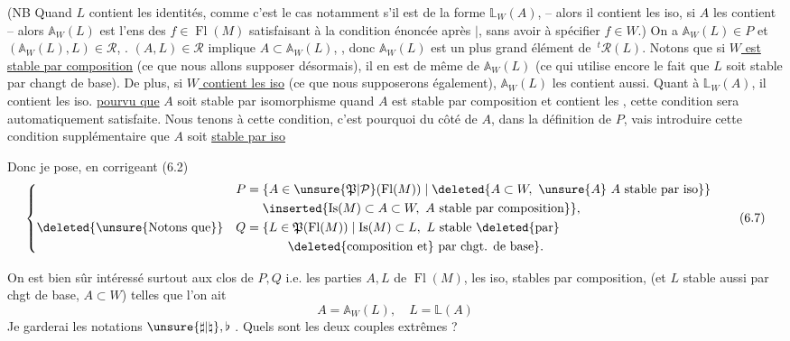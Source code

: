 (NB Quand $L$ contient les identités, comme c'est
le cas notamment s'il est de la forme $\mathbb L_W(A)$,
-- alors il contient les iso,  si $A$ les
contient -- alors $\mathbb A_W(L)$ est l'ens des $f\in\operatorname{Fl}(M)$
satisfaisant à la condition énoncée après $\mid$, sans
avoir à spécifier $f\in W$.) On a $\mathbb A_W(L)\in P$
 et  $(\mathbb A_W(L),L)\in\mathcal R$,
.
 $(A,L)\in\mathcal R$ implique $A\subset\mathbb A_W(L)$, 
,
donc $\mathbb A_W(L)$ est un plus grand élément de
$\,{}^{t}\mathcal R(L)$.
 Notons que si \uline{$W$ est stable par composition} (ce que
nous allons supposer désormais), il en est de même
de $\mathbb A_W(L)$ (ce qui utilise  encore
le fait que $L$ soit stable par changt de base).
De plus, si \uline{$W$ contient les iso} (ce que nous
supposerons également), $\mathbb A_W(L)$ les contient aussi.
Quant à $\mathbb L_W(A)$, il contient les iso.
\uline{pourvu que} $A$ soit stable par isomorphisme\unsure{;}
quand $A$ est stable par composition et contient les
, cette condition sera automatiquement satisfaite. Nous tenons à cette condition, c'est
pourquoi du côté de $A$, dans la définition
de $P$,  vais introduire cette condition
supplémentaire que $A$ soit \uline{stable par iso}

Donc je pose, en corrigeant (6.2)
\[
\left\{\begin{aligned}
P={}&\{A\in\unsure{\mathfrak{P}|\mathcal{P}}(\operatorname{Fl}(M))\mid
\deleted{A\subset W,\ \unsure{A}\ A\ \text{stable par iso}\}}\\
&\inserted{\operatorname{Is}(M)\subset A\subset W,\ A\ \text{stable par composition}}\},\\
\deleted{\text{\unsure{Notons que}}}\quad
Q={}&\{L\in\mathfrak{P}(\operatorname{Fl}(M))\mid\operatorname{Is}(M)\subset L,\ L\ \text{stable }\deleted{\text{par}}\\
&\qquad\deleted{\text{composition et}}\ \text{par chgt. de base}\}.
\end{aligned}\right.\tag*{(6.7)}
\]

On est bien sûr intéressé surtout aux
 clos de $P,Q$ i.e. les parties
$A,L$ de $\operatorname{Fl}(M)$,  les iso, stables
par composition, (et $L$ stable aussi par chgt
de base, $A\subset W$) telles que l'on ait
\[
A=\mathbb A_W(L),\quad L=\mathbb L(A)\tag*{(6.8)}
\]
Je garderai les notations $\unsure{\sharp|\natural},\flat$   .
Quels sont les deux couples extrêmes ?


